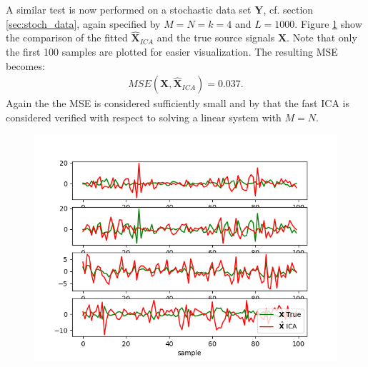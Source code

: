 A similar test is now performed on a stochastic data set  $\textbf{Y}$, cf. section \ref{sec:stoch_data}, again specified by $M=N=k=4$ and $L=1000$. 
Figure \ref{fig:appica3} show the comparison of the fitted $\hat{\textbf{X}}_{ICA}$ and the true source signals $\textbf{X}$. Note that only the first 100 samples are plotted for easier visualization. The resulting MSE becomes:
\begin{align*}
MSE(\textbf{X},\hat{\textbf{X}}_{ICA}) = 0.037.
\end{align*}       
Again the the MSE is considered sufficiently small and by that the fast ICA is considered verified with respect to solving a linear system with $M=N$. 
\begin{figure}[H]
	\centering
	\includegraphics[scale=0.5]{figures/ICAapp/ICA_app3.png}
	\caption{}
	\label{fig:appica3}
\end{figure}








  


